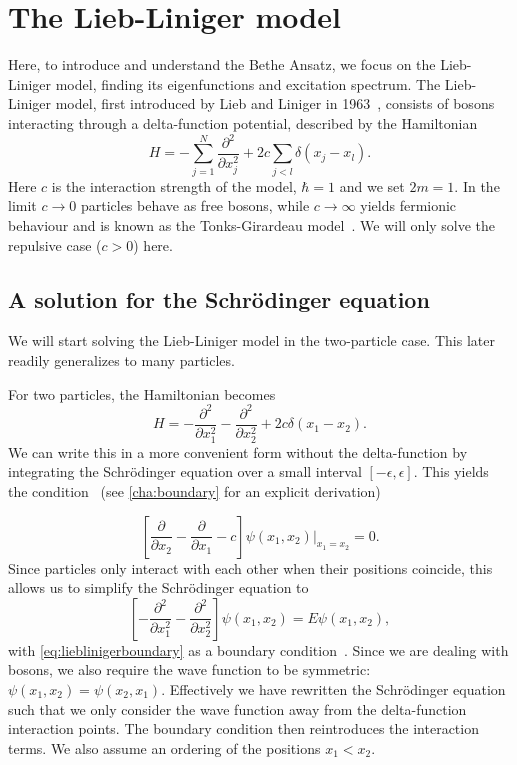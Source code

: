 \documentclass[11pt, a4paper]{report} %
\begin{document}
\section{The Lieb-Liniger model}

Here, to introduce and understand the Bethe Ansatz, we focus on the Lieb-Liniger model, finding its eigenfunctions and excitation spectrum.
The Lieb-Liniger model, first introduced by Lieb and Liniger in 1963~\cite{Lieb1963, Lieb1963a}, consists of bosons interacting through a delta-function potential, described by the Hamiltonian
\begin{equation}
	H = - \sum_{j=1}^{N} \frac{\partial^2}{\partial x_j^2} + 2c \sum_{j<l} \delta(x_j - x_l).
\end{equation}
Here \(c\) is the interaction strength of the model, \(\hbar=1\) and we set \(2m=1\).
In the limit \(c\to0\) particles behave as free bosons, while \(c\to\infty\) yields fermionic behaviour and is known as the Tonks-Girardeau model~\cite{Lieb1963, Franchini2017}.
We will only solve the repulsive case (\(c > 0\)) here.

\subsection{A solution for the Schrödinger equation}

We will start solving the Lieb-Liniger model in the two-particle case. This later readily generalizes to many particles.

For two particles, the Hamiltonian becomes
\begin{equation}
	H =  - \frac{\partial^2}{\partial x_1^2} - \frac{\partial^2}{\partial x_2^2} + 2c \delta(x_1 - x_2).
\end{equation}
We can write this in a more convenient form without the delta-function by integrating the Schrödinger equation over a small interval \([-\epsilon,\epsilon]\).
This yields the condition~\cite{Lieb1963} (see \cref{cha:boundary} for an explicit derivation)

\begin{equation}\label{eq:lieblinigerboundary}
	\left[\frac{\partial}{\partial x_2} - \frac{\partial}{\partial x_1} - c\right] \psi(x_1, x_2)\bigg\rvert_{x_1 = x_2} = 0.
\end{equation}
Since particles only interact with each other when their positions coincide, this allows us to simplify the Schrödinger equation to
\begin{equation}\label{eq:lieblinigersimple}
	\left[- \frac{\partial^2}{\partial x_1^2} - \frac{\partial^2}{\partial x_2^2}\right] \psi(x_1, x_2) = E \psi(x_1,x_2),
\end{equation}
with \cref{eq:lieblinigerboundary} as a boundary condition~\cite{Lieb1963}.
Since we are dealing with bosons, we also require the wave function to be symmetric: \(\psi(x_1,x_2) = \psi(x_2,x_1)\).
Effectively we have rewritten the Schrödinger equation such that we only consider the wave function away from the delta-function interaction points.
The boundary condition then reintroduces the interaction terms.
We also assume an ordering of the positions \(x_1 < x_2\).
\end{document}
